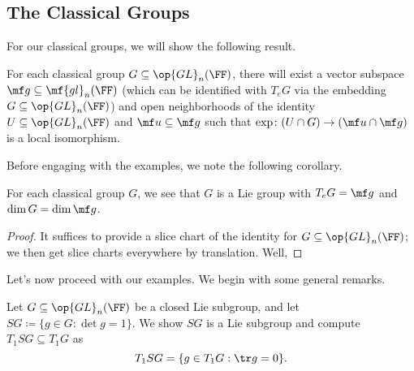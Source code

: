 \documentclass[../notes.tex]{subfiles}
\begin{document}
\subsection{The Classical Groups}
For our classical groups, we will show the following result.
\begin{theorem}
	For each classical group $G\subseteq\op{GL}_n(\FF)$, there will exist a vector subspace $\mf g\subseteq\mf{gl}_n(\FF)$ (which can be identified with $T_eG$ via the embedding $G\subseteq\op{GL}_n(\FF)$) and open neighborhoods of the identity $U\subseteq\op{GL}_n(\FF)$ and $\mf u\subseteq\mf g$ such that $\exp\colon(U\cap G)\to(\mf u\cap\mf g)$ is a local isomorphism.
\end{theorem}
Before engaging with the examples, we note the following corollary.
\begin{corollary}
	For each classical group $G$, we see that $G$ is a Lie group with $T_eG=\mf g$ and $\dim G=\dim\mf g$.
\end{corollary}
\begin{proof}
	It suffices to provide a slice chart of the identity for $G\subseteq\op{GL}_n(\FF)$; we then get slice charts everywhere by translation. Well, 
\end{proof}
Let's now proceed with our examples.
We begin with some general remarks.
\begin{lemma} \label{lem:special-tangent-space}
	Let $G\subseteq\op{GL}_n(\FF)$ be a closed Lie subgroup, and let $SG\coloneqq\{g\in G:\det g=1\}$. We show $SG$ is a Lie subgroup and compute $T_1SG\subseteq T_1G$ as
	\[T_1SG=\{g\in T_1G:\tr g=0\}.\]
\end{lemma}
\end{document}
